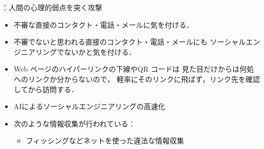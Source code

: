 ：人間の心理的弱点を突く攻撃

\begin{itemize}   
   \item 
      不審な直接のコンタクト・電話・メールに気を付ける．
   
   \item 
      不審でないと思われる直接のコンタクト・電話・メールにも
      ソーシャルエンジニアリングでないかと気を付ける．
   
   \item 
      Web ページのハイパーリンクの下線やQR コードは
      見た目だけからは何処へのリンクか分からないので，
      軽率にそのリンクに飛ばず，リンク先を確認してから訪問する．
      
%    
%             
%       
%      
      \item 
         AIによるソーシャルエンジニアリングの高速化

      \item 次のような情報収集が行われている：
      \begin{itemize}
         \item 
            フィッシングなどネットを使った違法な情報収集
            

\end{itemize}
\end{itemize}
